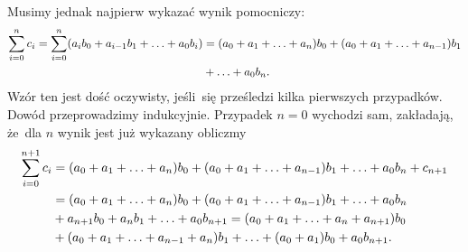 \documentclass[a4paper,11pt]{article}
\begin{document}
Musimy jednak najpierw wykazać wynik pomocniczy:
\begin{equation}
  \label{eq:Leja-22}
  \begin{split}
    \sum_{ i = 0 }^{ n } c_{ i } = \sum_{ i = 0 }^{ n } ( a_{ i } b_{
      0 } + a_{ i - 1 } b_{ 1 } + \ldots + a_{ 0 } b_{ i } ) &= ( a_{ 0 }
    + a_{ 1 } + \ldots + a_{ n } ) b_{ 0 } + ( a_{ 0 } + a_{ 1 }
    + \ldots + a_{ n - 1 } ) b_{ 1 } \\
    &+ \ldots + a_{ 0 } b_{ n }.
  \end{split}
\end{equation}
Wzór ten jest dość oczywisty, jeśli~się prześledzi kilka pierwszych
przypadków. Dowód przeprowadzimy indukcyjnie. Przypadek $n = 0$
wychodzi sam, zakładają, że~dla $n$ wynik jest już wykazany obliczmy
\begin{equation}
  \label{eq:Leja-23}
  \begin{split}
    \sum_{ i = 0 }^{ n + 1 } c_{ i } &= ( a_{ 0 } + a_{ 1 } + \ldots +
    a_{ n } ) b_{ 0 } + ( a_{ 0 } + a_{ 1 } + \ldots + a_{ n - 1 } ) b_{
      1 } + \ldots
    + a_{ 0 } b_{ n } + c_{ n + 1 } \\
    &= ( a_{ 0 } + a_{ 1 } + \ldots + a_{ n } ) b_{ 0 } + ( a_{ 0 } + a_{
      1 }
    + \ldots + a_{ n - 1 } ) b_{ 1 } + \ldots + a_{ 0 } b_{ n } \\
    &+ a_{ n + 1 } b_{ 0 } + a_{ n } b_{ 1 } + \ldots + a_{ 0 } b_{ n + 1
    }
    = ( a_{ 0 } + a_{ 1 } + \ldots + a_{ n } + a_{ n + 1 } ) b_{ 0 } \\
    &+ ( a_{ 0 } + a_{ 1 } + \ldots + a_{ n - 1 } + a_{ n } ) b_{ 1 } +
    \ldots + ( a_{ 0 } + a_{ 1 } ) b_{ 0 } + a_{ 0 } b_{ n + 1 }.
  \end{split}
\end{equation}
\end{document}
